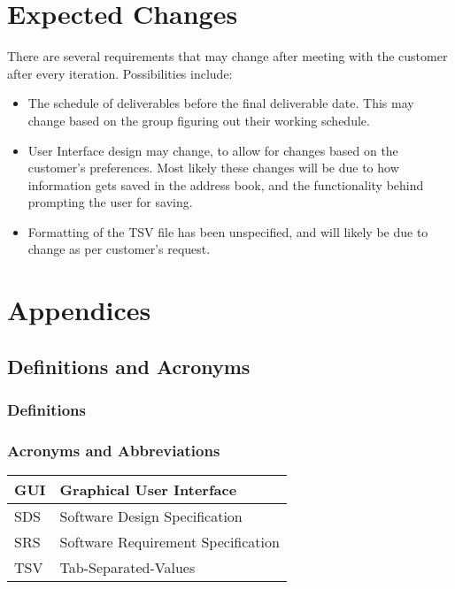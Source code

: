 \documentclass[a4paper, 11pt]{article}
\begin{document}
\section{Expected Changes}
There are several requirements that may change after meeting with the customer after every iteration. Possibilities include: 
\begin{itemize}
	\item The schedule of deliverables before the final deliverable date. This may change based on the group figuring out their working schedule.
	\item User Interface design may change, to allow for changes based on the customer's preferences. Most likely these changes will be due to how information gets saved in the address book, and the functionality behind prompting the user for saving.
	\item Formatting of the TSV file has been unspecified, and will likely be due to change as per customer's request.
\end{itemize}

\section{Appendices}

\subsection{Definitions and Acronyms}
\subsubsection{Definitions}
\subsubsection{Acronyms and Abbreviations}

	\begin{tabular}{ | m{1cm} | m{10cm} | } 
		\hline
		GUI & Graphical User Interface \\
		\hline
		SDS & Software Design Specification \\
		\hline
		SRS & Software Requirement Specification  \\
		\hline
		TSV & Tab-Separated-Values \\
		\hline
	\end{tabular}
\end{document}
